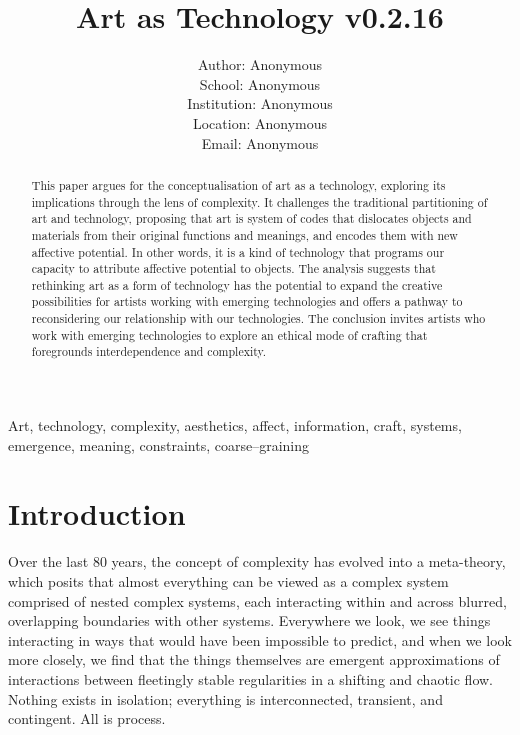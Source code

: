 \documentclass[letterpaper]{article}
\title{Art as Technology v0.2.16}
\author{Author: Anonymous\\
School: Anonymous\\
Institution: Anonymous\\
Location: Anonymous\\
Email: Anonymous\\
\newline
\newline
}
\begin{document}
 
\maketitle
\begin{abstract}

    This paper argues for the conceptualisation of art as a technology, exploring its implications through the lens of complexity. It challenges the traditional partitioning of art and technology, proposing that art is system of codes that dislocates objects and materials from their original functions and meanings, and encodes them with new affective potential. In other words, it is a kind of technology that programs our capacity to attribute affective potential to objects. The analysis suggests that rethinking art as a form of technology has the potential to expand the creative possibilities for artists working with emerging technologies and offers a pathway to reconsidering our relationship with our technologies. The conclusion invites artists who work with emerging technologies to explore an ethical mode of crafting that foregrounds interdependence and complexity.

\end{abstract}


Art, technology, complexity, aesthetics, affect, information, craft, systems, emergence, meaning, constraints, coarse–graining

\section{Introduction}

    Over the last 80 years, the concept of complexity has evolved into a meta-theory, which posits that almost everything can be viewed as a complex system comprised of nested complex systems, each interacting within and across blurred, overlapping boundaries with other systems. Everywhere we look, we see things interacting in ways that would have been impossible to predict, and when we look more closely, we find that the things themselves are emergent approximations of interactions between fleetingly stable regularities in a shifting and chaotic flow. Nothing exists in isolation; everything is interconnected, transient, and contingent. All is process.
\end{document}
